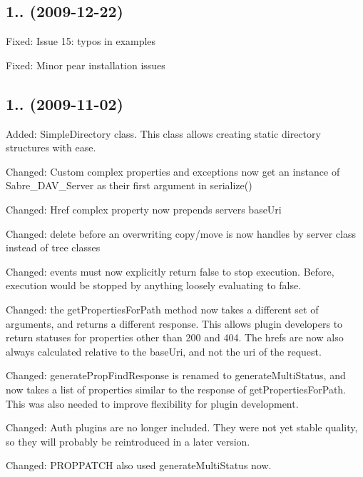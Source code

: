 \subsection*{1.. (2009-\/12-\/22) }


\begin{DoxyItemize}
\item Fixed\+: Issue 15\+: typos in examples
\item Fixed\+: Minor pear installation issues
\end{DoxyItemize}

\subsection*{1.. (2009-\/11-\/02) }


\begin{DoxyItemize}
\item Added\+: Simple\+Directory class. This class allows creating static directory structures with ease.
\item Changed\+: Custom complex properties and exceptions now get an instance of Sabre\+\_\+\+D\+A\+V\+\_\+\+Server as their first argument in serialize()
\item Changed\+: Href complex property now prepends server\textquotesingle{}s base\+Uri
\item Changed\+: delete before an overwriting copy/move is now handles by server class instead of tree classes
\item Changed\+: events must now explicitly return false to stop execution. Before, execution would be stopped by anything loosely evaluating to false.
\item Changed\+: the get\+Properties\+For\+Path method now takes a different set of arguments, and returns a different response. This allows plugin developers to return statuses for properties other than 200 and 404. The hrefs are now also always calculated relative to the base\+Uri, and not the uri of the request.
\item Changed\+: generate\+Prop\+Find\+Response is renamed to generate\+Multi\+Status, and now takes a list of properties similar to the response of get\+Properties\+For\+Path. This was also needed to improve flexibility for plugin development.
\item Changed\+: Auth plugins are no longer included. They were not yet stable quality, so they will probably be reintroduced in a later version.
\item Changed\+: P\+R\+O\+P\+P\+A\+T\+CH also used generate\+Multi\+Status now.

\end{DoxyItemize}
